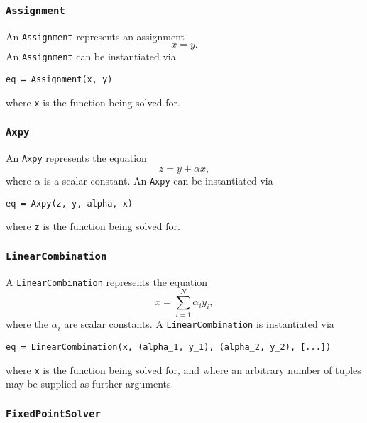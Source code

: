 \documentclass[11pt]{article}
\begin{document}
\subsubsection{\texttt{Assignment}}

An \texttt{Assignment} represents an assignment
\begin{equation*}
  x = y.
\end{equation*}
An \texttt{Assignment} can be instantiated via
\begin{lstlisting}
eq = Assignment(x, y)
\end{lstlisting}
where \texttt{x} is the function being solved for.

\subsubsection{\texttt{Axpy}}

An \texttt{Axpy} represents the equation
\begin{equation*}
  z = y + \alpha x,
\end{equation*}
where $\alpha$ is a scalar constant. An \texttt{Axpy} can be instantiated
via
\begin{lstlisting}
eq = Axpy(z, y, alpha, x)
\end{lstlisting}
where \texttt{z} is the function being solved for.

\subsubsection{\texttt{LinearCombination}}

A \texttt{LinearCombination} represents the equation
\begin{equation*}
  x = \sum_{i = 1}^N \alpha_i y_i,
\end{equation*}
where the $\alpha_i$ are scalar constants. A \texttt{LinearCombination} is
instantiated via
\begin{lstlisting}
eq = LinearCombination(x, (alpha_1, y_1), (alpha_2, y_2), [...])
\end{lstlisting}
where \texttt{x} is the function being solved for, and where an arbitrary
number of tuples may be supplied as further arguments.

\subsubsection{\texttt{FixedPointSolver}}
\end{document}

